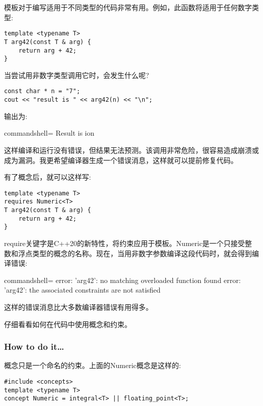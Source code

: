 
模板对于编写适用于不同类型的代码非常有用。例如，此函数将适用于任何数字类型:

\begin{lstlisting}[style=styleCXX]
template <typename T>
T arg42(const T & arg) {
	return arg + 42;
}
\end{lstlisting}

当尝试用非数字类型调用它时，会发生什么呢?

\begin{lstlisting}[style=styleCXX]
const char * n = "7";
cout << "result is " << arg42(n) << "\n";
\end{lstlisting}

输出为:

\begin{tcblisting}{commandshell={}}
Result is ion
\end{tcblisting}

这样编译和运行没有错误，但结果无法预测。该调用非常危险，很容易造成崩溃或成为漏洞。我更希望编译器生成一个错误消息，这样就可以提前修复代码。

有了概念后，就可以这样写:

\begin{lstlisting}[style=styleCXX]
template <typename T>
requires Numeric<T>
T arg42(const T & arg) {
	return arg + 42;
}
\end{lstlisting}

require关键字是C++20的新特性，将约束应用于模板。Numeric是一个只接受整数和浮点类型的概念的名称。现在，当用非数字参数编译这段代码时，就会得到编译错误:

\begin{tcblisting}{commandshell={}}
error: 'arg42': no matching overloaded function found
error: 'arg42': the associated constraints are not satisfied
\end{tcblisting}

这样的错误消息比大多数编译器错误有用得多。

仔细看看如何在代码中使用概念和约束。

\subsubsection{How to do it…}

概念只是一个命名的约束。上面的Numeric概念是这样的:

\begin{lstlisting}[style=styleCXX]
#include <concepts>
template <typename T>
concept Numeric = integral<T> || floating_point<T>;
\end{lstlisting}

